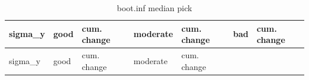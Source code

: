 \documentclass[
  letterpaper,
  DIV=11,
  numbers=noendperiod]{scrartcl}
\begin{document}
\begin{longtable}[]{@{}
  >{\raggedleft\arraybackslash}p{}
  >{\raggedleft\arraybackslash}p{}
  >{\raggedleft\arraybackslash}p{}
  >{\raggedleft\arraybackslash}p{}
  >{\raggedleft\arraybackslash}p{}
  >{\raggedleft\arraybackslash}p{}
  >{\raggedleft\arraybackslash}p{}@{}}
\caption{boot.inf median pick}\tabularnewline
\toprule\noalign{}
\begin{minipage}[b]{\linewidth}\raggedleft
sigma\_y
\end{minipage} & \begin{minipage}[b]{\linewidth}\raggedleft
good
\end{minipage} & \begin{minipage}[b]{\linewidth}\raggedleft
cum. change
\end{minipage} & \begin{minipage}[b]{\linewidth}\raggedleft
moderate
\end{minipage} & \begin{minipage}[b]{\linewidth}\raggedleft
cum. change
\end{minipage} & \begin{minipage}[b]{\linewidth}\raggedleft
bad
\end{minipage} & \begin{minipage}[b]{\linewidth}\raggedleft
cum. change
\end{minipage} \\
\midrule\noalign{}
\endfirsthead
\toprule\noalign{}
\begin{minipage}[b]{\linewidth}\raggedleft
sigma\_y
\end{minipage} & \begin{minipage}[b]{\linewidth}\raggedleft
good
\end{minipage} & \begin{minipage}[b]{\linewidth}\raggedleft
cum. change
\end{minipage} & \begin{minipage}[b]{\linewidth}\raggedleft
moderate
\end{minipage} & \begin{minipage}[b]{\linewidth}\raggedleft
cum. change
\end{minipage} & \begin{minipage}[b]{\linewidth}\raggedleft

\end{minipage}
\end{longtable}
\end{document}
